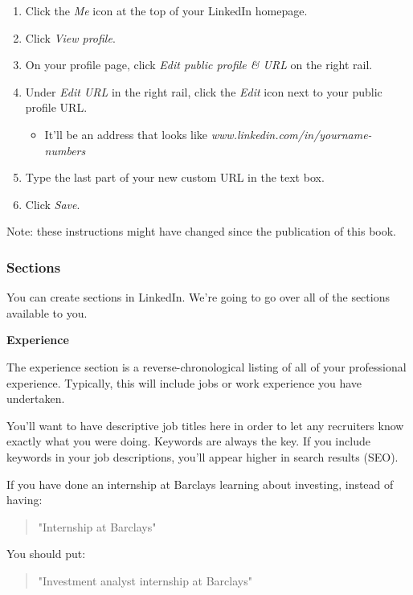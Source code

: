 \documentclass{article}
\begin{document}
\begin{enumerate}
\def\labelenumi{\arabic{enumi}.}
\item
  Click the \emph{Me} icon at the top of your LinkedIn homepage.
\item
  Click \emph{View profile}.
\item
  On your profile page, click \emph{Edit public profile \& URL} on the
  right rail.
\item
  Under \emph{Edit URL} in the right rail, click the \emph{Edit} icon
  next to your public profile URL.

  \begin{itemize}
  \item
    It'll be an address that looks like
    \emph{www.linkedin.com/in/yourname-numbers}
  \end{itemize}
\item
  Type the last part of your new custom URL in the text box.
\item
  Click \emph{Save}.
\end{enumerate}

Note: these instructions might have changed since the publication of
this book.

\subsubsection{Sections}
You can create sections in LinkedIn. We're going to go over all of the
sections available to you.

\textbf{Experience}

The experience section is a reverse-chronological listing of all of your
professional experience. Typically, this will include jobs or work
experience you have undertaken.

You'll want to have descriptive job titles here in order to let any
recruiters know exactly what you were doing. Keywords are always the
key. If you include keywords in your job descriptions, you'll appear
higher in search results (SEO).

If you have done an internship at Barclays learning about investing,
instead of having:

\begin{quote}"Internship at Barclays"\end{quote}

You should put:

\begin{quote}"Investment analyst internship at Barclays"\end{quote}
\end{document}
